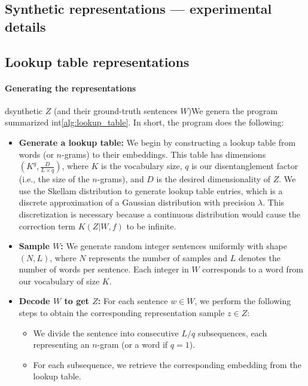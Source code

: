 \documentclass{article}
\begin{document}
\begin{appendices}
\section{Synthetic representations --- experimental details}
\label{sec:synthetic_details}

\subsection{Lookup table representations}

\paragraph{Generating the representations}

dsynthetic  $Z$ (and their ground-truth sentences $W$)We genera the program summarized int\cref{alg:lookup_table}. In short, the program does the following:

\begin{itemize}
    \item \textbf{Generate a lookup table:}
    We begin by constructing a lookup table from words (or $n$-grams) to their embeddings. This table has dimensions $(K^q, \frac{D}{L \times q})$, where $K$ is the vocabulary size, $q$ is our disentanglement factor (i.e., the size of the $n$-grams), and $D$ is the desired dimensionality of $Z$. We use the Skellam distribution to generate lookup table entries, which is a discrete approximation of a Gaussian distribution with precision $\lambda$. This discretization is necessary because a continuous distribution would cause the correction term $K(Z|W,f)$ to be infinite.
    
    \item \textbf{Sample $W$:}
    We generate random integer sentences uniformly with shape $(N, L)$, where $N$ represents the number of samples and $L$ denotes the number of words per sentence. Each integer in $W$ corresponds to a word from our vocabulary of size $K$.
    
    \item \textbf{Decode $W$ to get $Z$:}
    For each sentence $w \in W$, we perform the following steps to obtain the corresponding representation sample $z \in Z$:
    \begin{itemize}
        \item We divide the sentence into consecutive $L/q$ subsequences, each representing an $n$-gram (or a word if $q=1$).
        
        \item For each subsequence, we retrieve the corresponding embedding from the lookup table.
        

\end{itemize}
\end{itemize}
\end{appendices}
\end{document}

